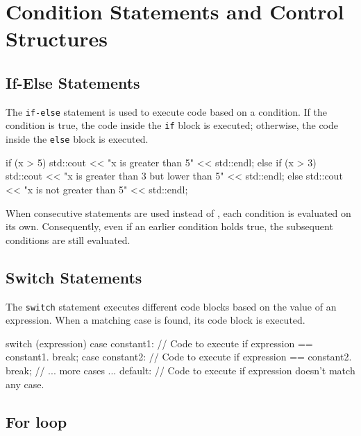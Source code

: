 \newpage

\section{Condition Statements and Control Structures}

\subsection{If-Else Statements}

The \texttt{if-else} statement is used to execute code based on a condition. If the condition is true, the code inside the \texttt{if} block is executed; otherwise, the code inside the \texttt{else} block is executed.

\begin{codeblock}[language=C++]
if (x > 5) {
    std::cout << "x is greater than 5" << std::endl;
} else if (x > 3) {
    std::cout << "x is greater than 3 but lower than 5" << std::endl;
} else {
    std::cout << "x is not greater than 5" << std::endl;
}
\end{codeblock}

\begin{tipsblock}
    When consecutive  statements are used instead of , each condition is evaluated on its own. Consequently, even if an earlier condition holds true, the subsequent conditions are still evaluated.
\end{tipsblock}

\subsection{Switch Statements}

The \texttt{switch} statement executes different code blocks based on the value of an expression. When a matching case is found, its code block is executed.

\begin{codeblock}[language=C++]
switch (expression) {
    case constant1:
        // Code to execute if expression == constant1.
        break;
    case constant2:
        // Code to execute if expression == constant2.
        break;
    // ... more cases ...
    default:
        // Code to execute if expression doesn't match any case.
}
\end{codeblock}

\subsection{For loop}

